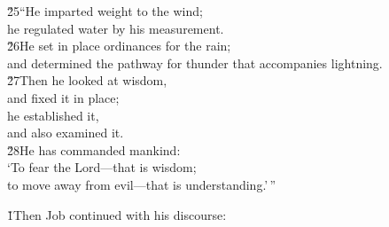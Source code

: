 \begin{poetry}
\poeml \v{25}``He imparted weight to the wind; \\
\poemll    he regulated water by his measurement. \\
\poeml \v{26}He set in place ordinances for the rain; \\
\poemll    and determined the pathway for thunder that accompanies lightning. \\
\poeml \v{27}Then he looked at wisdom, \\
\poemll    and fixed it in place; \\
\poeml he established it, \\
\poemll    and also examined it. \\
\poeml \v{28}He has commanded mankind: \\
\poemll    `To fear the Lord---that is wisdom; \\
\poemlll       to move away from evil---that is understanding.'\,''
\end{poetry}

\v{1}Then Job continued with his discourse:


